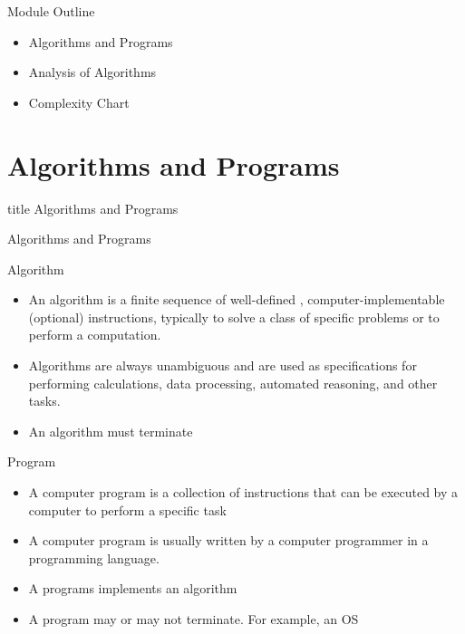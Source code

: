 \documentclass[aspectratio=169, xcolor=dvipsnames]{beamer}
\begin{document}
\begin{frame}{Module Outline}
    \begin{block}{}
        \begin{itemize}[<+->]
            \item Algorithms and Programs
            \item Analysis of Algorithms
            \item Complexity Chart
        \end{itemize}
    \end{block}
\end{frame}

\section{Algorithms and Programs}
\begin{frame}
  \vfill
  \centering
  \begin{beamercolorbox}[sep=8pt,center,shadow=true,rounded=true]{title}
    Algorithms and Programs\par%
  \end{beamercolorbox}
  \vfill
\end{frame}

\begin{frame}{Algorithms and Programs}
    \begin{block}{Algorithm}
        \begin{itemize}[<+->]
            \item An algorithm is a finite sequence of well-defined , computer-implementable (optional) instructions, typically to solve a class of specific problems or to perform a computation.
            \item Algorithms are always unambiguous and are used as specifications for performing calculations, data processing, automated reasoning, and other tasks.
            \item An algorithm must terminate
        \end{itemize}
    \end{block}
    \begin{alertblock}{Program}
        \begin{itemize}[<+->]
            \item A computer program is a collection of instructions that can be executed by a computer to perform a specific task
            \item A computer program is usually written by a computer programmer in a programming language.
            \item A programs implements an algorithm
            \item A program may or may not terminate. For example, an OS
        \end{itemize}
    \end{alertblock}
\end{frame}
\end{document}
